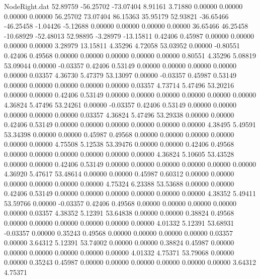 \begin{filecontents}{NodeRight.dat}
  52.89759  -56.25702  -73.07404     8.91161    3.71880    0.00000    0.00000    0.00000    0.00000   56.25702   73.07404   86.15363   35.95179
  52.93821  -36.65466  -46.25458    -1.04426   -5.12688    0.00000    0.00000    0.00000    0.00000   36.65466   46.25458  -10.68929  -52.48013
  52.98895   -3.28979  -13.15811     0.42406    0.45987    0.00000    0.00000    0.00000    0.00000    3.28979   13.15811    4.35296    4.72058
  53.03952    0.00000   -0.80551     0.42406    0.49568    0.00000    0.00000    0.00000    0.00000    0.00000    0.80551    4.35296    5.08819
  53.09044    0.00000   -0.03357     0.42406    0.53149    0.00000    0.00000    0.00000    0.00000    0.00000    0.03357    4.36730    5.47379
  53.13097    0.00000   -0.03357     0.45987    0.53149    0.00000    0.00000    0.00000    0.00000    0.00000    0.03357    4.73714    5.47496
  53.20216    0.00000    0.00000     0.42406    0.53149    0.00000    0.00000    0.00000    0.00000    0.00000    0.00000    4.36824    5.47496
  53.24261    0.00000   -0.03357     0.42406    0.53149    0.00000    0.00000    0.00000    0.00000    0.00000    0.03357    4.36824    5.47496
  53.29338    0.00000    0.00000     0.42406    0.53149    0.00000    0.00000    0.00000    0.00000    0.00000    0.00000    4.38495    5.49591
  53.34398    0.00000    0.00000     0.45987    0.49568    0.00000    0.00000    0.00000    0.00000    0.00000    0.00000    4.75508    5.12538
  53.39476    0.00000    0.00000     0.42406    0.49568    0.00000    0.00000    0.00000    0.00000    0.00000    0.00000    4.36824    5.10605
  53.43528    0.00000    0.00000     0.42406    0.53149    0.00000    0.00000    0.00000    0.00000    0.00000    0.00000    4.36920    5.47617
  53.48614    0.00000    0.00000     0.45987    0.60312    0.00000    0.00000    0.00000    0.00000    0.00000    0.00000    4.75324    6.23388
  53.53688    0.00000    0.00000     0.42406    0.53149    0.00000    0.00000    0.00000    0.00000    0.00000    0.00000    4.38352    5.49411
  53.59766    0.00000   -0.03357     0.42406    0.49568    0.00000    0.00000    0.00000    0.00000    0.00000    0.03357    4.38352    5.12391
  53.64838    0.00000    0.00000     0.38824    0.49568    0.00000    0.00000    0.00000    0.00000    0.00000    0.00000    4.01332    5.12391
  53.68931   -0.03357    0.00000     0.35243    0.49568    0.00000    0.00000    0.00000    0.00000    0.03357    0.00000    3.64312    5.12391
  53.74002    0.00000    0.00000     0.38824    0.45987    0.00000    0.00000    0.00000    0.00000    0.00000    0.00000    4.01332    4.75371
  53.79068    0.00000    0.00000     0.35243    0.45987    0.00000    0.00000    0.00000    0.00000    0.00000    0.00000    3.64312    4.75371

\end{filecontents}

